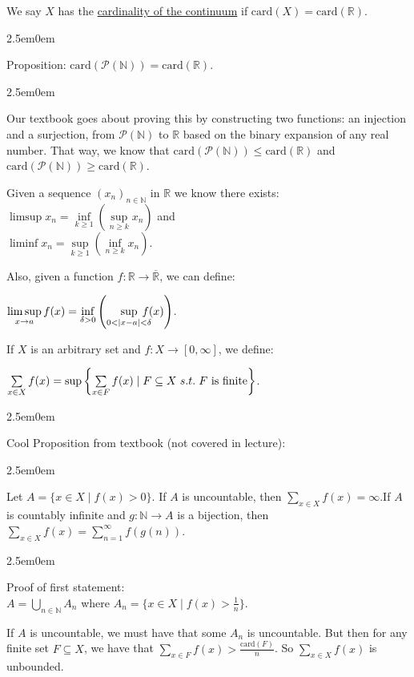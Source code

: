 \documentclass{book}
\newcommand{\hTwo}{%
\color{MidnightBlue}%
   \fontsize{13}{15}\selectfont%
}
\newcommand{\hThree}{%
   \color{PineGreen!85!Orange}
   \fontsize{12}{14}\selectfont%
}
\newenvironment{myIndent}{%
   \begin{adjustwidth}{2.5em}{0em}%
}{%
   \end{adjustwidth}%
}
\newcommand{\udefine}[1]{{%
   \setulcolor{Red}%
   \setul{0.14em}{0.07em}%
   \ul{#1}%
}}
\newcommand{\suchthat}{ \hspace{0.3em}s.t.\hspace{0.3em}}
\newcommand{\card}{\mathrm{card}}
\newcommand{\retTwo}{\hfill\bigbreak}
\begin{document}
We say $X$ has the \udefine{cardinality of the continuum} if $\card(X) = \card(\mathbb{R})$.

\begin{myIndent}\hTwo
	Proposition: $\card(\mathcal{P}(\mathbb{N})) = \card(\mathbb{R})$.
	\begin{myIndent}\hThree
		Our textbook goes about proving this by constructing two functions: an injection and a surjection, from $\mathcal{P}(\mathbb{N})$ to $\mathbb{R}$ based on the binary expansion of any real number. That way, we know that $\card(\mathcal{P}(\mathbb{N})) \leq \card(\mathbb{R})$ and $\card(\mathcal{P}(\mathbb{N})) \geq \card(\mathbb{R})$.\retTwo
	\end{myIndent}
\end{myIndent}

Given a sequence $(x_n)_{n \in \mathbb{N}}$ in $\mathbb{R}$ we know there exists: $\limsup x_n = \inf\limits_{k \geq 1}(\sup\limits_{n \geq k} x_n)$ and\\ [-10pt] $\liminf x_n = \sup\limits_{k \geq 1}(\inf\limits_{n \geq k} x_n)$.\retTwo

Also, given a function $f: \mathbb{R} \longrightarrow \overline{\mathbb{R}}$, we can define:

{\centering $\limsup\limits_{x \rightarrow a}f(x) = \inf\limits_{\delta > 0}\left(\sup\limits_{0 < |x-a|<\delta}\hspace{-1em}f(x)\right)$.\newpage\par}

If $X$ is an arbitrary set and $f: X \longrightarrow [0, \infty]$, we define:

{\centering $\sum\limits_{x \in X}f(x) = \sup\left\{\sum\limits_{x \in F}f(x) \mid F \subseteq X \suchthat F \text{ is finite}\right\}$.\retTwo\par}

\begin{myIndent}\hTwo
	Cool Proposition from textbook (not covered in lecture):
	\begin{myIndent}\hTwo
		Let $A = \{x \in X \mid f(x) > 0\}$. If $A$ is uncountable, then $\sum\limits_{x \in X}f(x) = \infty$.\retTwo If $A$ is countably infinite and $g:\mathbb{N} \longrightarrow A$ is a bijection, then\\ $\sum\limits_{x \in X}f(x) = \sum\limits_{n = 1}^\infty f(g(n))$.\retTwo
		
		\begin{myIndent}\hThree
			Proof of first statement:\\
			$A = \bigcup\limits_{n \in \mathbb{N}}A_n$ where $A_n = \{x \in X \mid f(x) > \frac{1}{n}\}$.\retTwo

			If $A$ is uncountable, we must have that some $A_n$ is uncountable. But then for any finite set $F \subseteq X$, we have that $\sum\limits_{x \in F}f(x) > \frac{\card(F)}{n}$. So $\sum\limits_{x \in X}f(x)$ is\\ [-7pt] unbounded.\retTwo
		\end{myIndent}
	\end{myIndent}
\end{myIndent}
\end{document}
